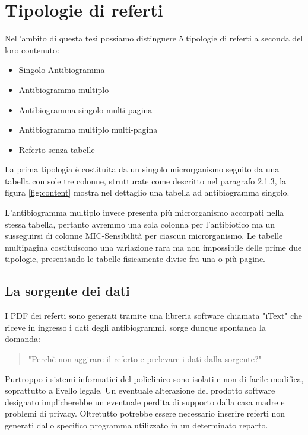 \section{Tipologie di referti}
Nell'ambito di questa tesi possiamo distinguere 5 tipologie di referti a seconda del loro contenuto:
\begin{itemize}
	\item Singolo Antibiogramma
	\item Antibiogramma multiplo
	\item Antibiogramma singolo multi-pagina
	\item Antibiogramma multiplo multi-pagina
	\item Referto senza tabelle
\end{itemize}
\bigskip
La prima tipologia è costituita da un singolo microrganismo seguito da una tabella con sole tre colonne, strutturate come descritto nel paragrafo 2.1.3, la figura \ref{fig:content} mostra nel dettaglio una tabella ad antibiogramma singolo.
 
L'antibiogramma multiplo invece presenta più microrganismo accorpati nella stessa tabella, pertanto avremmo una sola colonna per l'antibiotico ma un susseguirsi di colonne MIC-Sensibilità per ciascun microrganismo.
Le tabelle multipagina costituiscono una variazione rara ma non impossibile delle prime due tipologie, presentando le tabelle fisicamente divise fra una o più pagine.

\subsection{La sorgente dei dati}
I PDF dei referti sono generati tramite una libreria software chiamata "iText" che riceve in ingresso i dati degli antibiogrammi, sorge dunque spontanea la domanda: 
\begin{quotation}
  "Perchè non aggirare il referto e prelevare i dati dalla sorgente?"
\end{quotation}
Purtroppo i sistemi informatici del policlinico sono isolati e non di facile modifica, soprattutto a livello legale. Un eventuale alterazione del prodotto software designato implicherebbe un eventuale perdita di supporto dalla casa madre e problemi di privacy. Oltretutto potrebbe essere necessario inserire referti non generati dallo specifico programma utilizzato in un determinato reparto.



